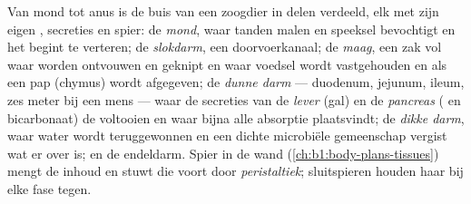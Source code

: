 \begin{proposition}\label{prop:b1:digestion-absorption:tract}
Van mond tot anus is de buis van een zoogdier in delen verdeeld, elk met
zijn eigen , secreties en spier: de \emph{mond}, waar tanden malen
en speeksel bevochtigt en het  begint te verteren; de
\emph{slokdarm}, een doorvoerkanaal; de \emph{maag}, een zak vol  waar
 worden ontvouwen en geknipt en waar voedsel wordt vastgehouden en
als een pap (chymus) wordt afgegeven; de \emph{dunne darm} --- duodenum,
jejunum, ileum, zes meter bij een mens --- waar de secreties van de
\emph{lever} (gal) en de \emph{pancreas} ( en bicarbonaat) de
 voltooien en waar bijna alle absorptie plaatsvindt; de
\emph{dikke darm}, waar water wordt teruggewonnen en een dichte
microbiële gemeenschap vergist wat er over is; en de endeldarm. Spier in
de wand (\cref{ch:b1:body-plans-tissues}) mengt de inhoud en stuwt die
voort door \emph{peristaltiek}; sluitspieren houden haar bij elke fase
tegen.
\end{proposition}

